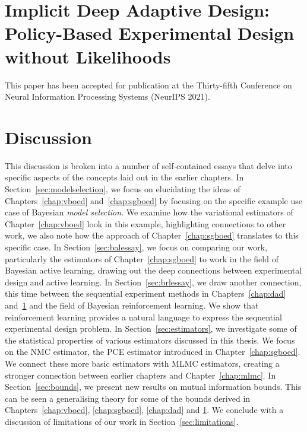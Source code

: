 \documentclass[a4paper, 10pt]{report}
\theoremstyle{plain}
\begin{document}
	\chapter{Implicit Deep Adaptive Design: Policy-Based Experimental Design without Likelihoods}
	\label{chap:idad}
	This paper has been accepted for publication at the Thirty-fifth Conference on Neural Information Processing Systems (NeurIPS 2021).
	
	
	
	\chapter{Discussion}
	\label{chap:discussion}
	This discussion is broken into a number of self-contained essays that delve into specific aspects of the concepts laid out in the earlier chapters.
	In Section~\ref{sec:modelselection}, we focus on elucidating the ideas of Chapters~\ref{chap:vboed} and~\ref{chap:sgboed} by focusing on the specific example use case of Bayesian \emph{model selection}. We examine how the variational estimators of Chapter~\ref{chap:vboed} look in this example, highlighting connections to other work, we also note how the approach of Chapter~\ref{chap:sgboed} translates to this specific case.
	In Section~\ref{sec:balessay}, we focus on comparing our work, particularly the estimators of Chapter~\ref{chap:sgboed} to work in the field of Bayesian active learning, drawing out the deep connections between experimental design and active learning.
	In Section~\ref{sec:brlessay}, we draw another connection, this time between the sequential experiment methods in Chapters~\ref{chap:dad} and~\ref{chap:idad} and the field of Bayesian reinforcement learning. We show that reinforcement learning provides a natural language to express the sequential experimental design problem.
	In Section~\ref{sec:estimators}, we investigate some of the statistical properties of various estimators discussed in this thesis. We focus on the NMC estimator, the PCE estimator introduced in Chapter~\ref{chap:sgboed}. We connect these more basic estimators with MLMC estimators, creating a stronger connection between earlier chapters and Chapter~\ref{chap:mlmc}.
	In Section~\ref{sec:bounds}, we present new results on mutual information bounds. This can be seen a generalising theory for some of the bounds derived in Chapters~\ref{chap:vboed}, \ref{chap:sgboed}, \ref{chap:dad} and \ref{chap:idad}.
	We conclude with a discussion of limitations of our work in Section~\ref{sec:limitations}.
\end{document}
